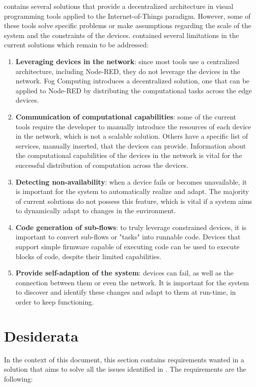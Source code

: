  contains several solutions that provide a decentralized architecture in visual programming tools applied to the Internet-of-Things paradigm. However, some of these tools solve specific problems or make assumptions regarding the scale of the system and the constraints of the devices.
 contained several limitations in the current solutions which remain to be addressed:
\begin{enumerate}
    \item \textbf{Leveraging devices in the network}: since most tools use a centralized architecture, including Node-RED, they do not leverage the devices in the network. Fog Computing introduces a decentralized solution, one that can be applied to Node-RED by distributing the computational tasks across the edge devices.
    \item \textbf{Communication of computational capabilities}: some of the current tools require the developer to manually introduce the resources of each device in the network, which is not a scalable solution. Others have a specific list of services, manually inserted, that the devices can provide. Information about the computational capabilities of the devices in the network is vital for the successful distribution of computation across the devices.
    \item \textbf{Detecting non-availability}: when a device fails or becomes unavailable, it is important for the system to automatically realize and adapt. The majority of current solutions do not possess this feature, which is vital if a system aims to dynamically adapt to changes in the environment.
    \item \textbf{Code generation of sub-flows}: to truly leverage constrained devices, it is important to convert sub-flows or "tasks" into runnable code. Devices that support simple firmware capable of executing code can be used to execute blocks of code, despite their limited capabilities.
    \item \textbf{Provide self-adaption of the system}: devices can fail, as well as the connection between them or even the network. It is important for the system to discover and identify these changes and adapt to them at run-time, in order to keep functioning.
\end{enumerate}

\section{Desiderata}\label{sec:desiderata}
In the context of this document, this section contains requirements wanted in a solution that aims to solve all the issues identified in . The requirements are the following:

